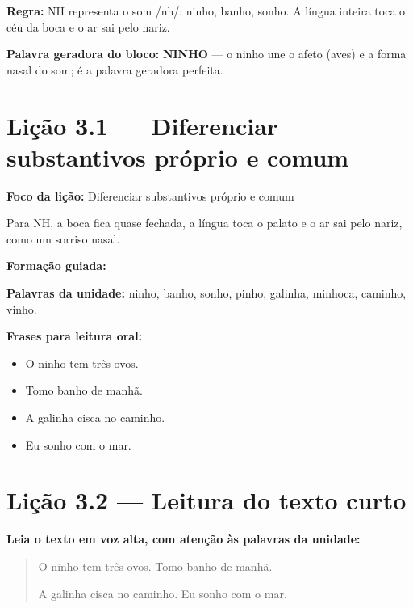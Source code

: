 \textbf{Regra:} NH representa o som /nh/: ninho, banho, sonho. A língua inteira toca o céu da boca e o ar sai pelo nariz.

\textbf{Palavra geradora do bloco:} \textbf{NINHO} --- o ninho une o afeto (aves) e a forma nasal do som; é a palavra geradora perfeita.

\section{Lição 3.1 --- Diferenciar substantivos próprio e comum}

\textbf{Foco da lição:} Diferenciar substantivos próprio e comum


\begin{boquinha}
Para NH, a boca fica quase fechada, a língua toca o palato e o ar sai pelo nariz, como um sorriso nasal.
\end{boquinha}

\noindent\textbf{Formação guiada:}

\begin{center}
\end{center}

\noindent\textbf{Palavras da unidade:} ninho, banho, sonho, pinho, galinha, minhoca, caminho, vinho.

\noindent\textbf{Frases para leitura oral:}
\begin{itemize}[leftmargin=1.6em]
  \item O ninho tem três ovos.
  \item Tomo banho de manhã.
  \item A galinha cisca no caminho.
  \item Eu sonho com o mar.
\end{itemize}

\section{Lição 3.2 --- Leitura do texto curto}

\noindent\textbf{Leia o texto em voz alta, com atenção às palavras da unidade:}


\begin{quote}
O ninho tem três ovos. Tomo banho de manhã.

A galinha cisca no caminho. Eu sonho com o mar.
\end{quote}

